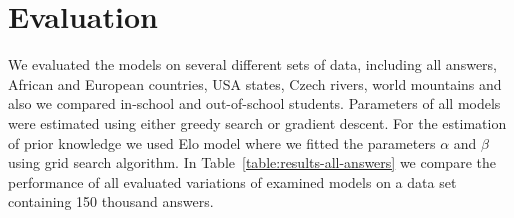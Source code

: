 \section{Evaluation}
\label{evaluation}

We evaluated the models on several different sets of data, including all answers, African and European countries, USA states, Czech rivers, world mountains and also we compared in-school and out-of-school students. Parameters of all models were estimated using either greedy search or gradient descent. For the estimation of prior knowledge we used Elo model where we fitted the parameters $\alpha$ and $\beta$ using grid search algorithm. In Table~\ref{table:results-all-answers} we compare the performance of all evaluated variations of examined models on a data set containing 150 thousand answers.


